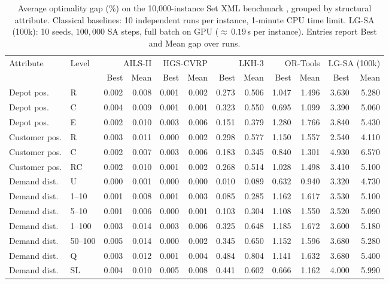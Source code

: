 \documentclass[letterpaper]{article} %
\begin{document}
\begin{table}[t]
\centering
\caption{Average optimality gap (\%) on the 10,000-instance Set XML benchmark \citep{queiroga_10000_nodate}, grouped by structural attribute. Classical baselines: 10 independent runs per instance, 1-minute CPU time limit. LG-SA (100k): 10 seeds, $100{,}000$ SA steps, full batch on GPU ($\approx$\,$0.19$\,s per instance). Entries report Best and Mean gap over runs.}
\label{tab:xml_by_groups}
\small
\begin{tabular}{llrrrrrrrrrr}
\toprule
Attribute & Level & \multicolumn{2}{r}{AILS-II} & \multicolumn{2}{r}{HGS-CVRP} & \multicolumn{2}{r}{LKH-3} & \multicolumn{2}{r}{OR-Tools} & \multicolumn{2}{r}{LG-SA (100k)} \\
 &  & Best & Mean & Best & Mean & Best & Mean & Best & Mean & Best & Mean \\
\midrule
Depot pos. & R & 0.002 & 0.008 & 0.001 & 0.002 & 0.273 & 0.506 & 1.047 & 1.496 & 3.630 & 5.280 \\
Depot pos. & C & 0.004 & 0.009 & 0.001 & 0.001 & 0.323 & 0.550 & 0.695 & 1.099 & 3.390 & 5.060 \\
Depot pos. & E & 0.002 & 0.010 & 0.003 & 0.006 & 0.151 & 0.379 & 1.280 & 1.766 & 3.840 & 5.430 \\
Customer pos. & R & 0.003 & 0.011 & 0.000 & 0.002 & 0.298 & 0.577 & 1.150 & 1.557 & 2.540 & 4.110 \\
Customer pos. & C & 0.002 & 0.007 & 0.003 & 0.006 & 0.183 & 0.345 & 0.840 & 1.301 & 4.930 & 6.570 \\
Customer pos. & RC & 0.002 & 0.010 & 0.001 & 0.002 & 0.268 & 0.514 & 1.028 & 1.498 & 3.410 & 5.100 \\
Demand dist. & U & 0.000 & 0.001 & 0.000 & 0.000 & 0.010 & 0.089 & 0.632 & 0.940 & 3.320 & 4.730 \\
Demand dist. & 1--10 & 0.001 & 0.008 & 0.001 & 0.003 & 0.085 & 0.285 & 1.162 & 1.617 & 3.530 & 5.100 \\
Demand dist. & 5--10 & 0.001 & 0.006 & 0.000 & 0.001 & 0.103 & 0.304 & 1.108 & 1.550 & 3.520 & 5.090 \\
Demand dist. & 1--100 & 0.003 & 0.014 & 0.003 & 0.006 & 0.325 & 0.648 & 1.185 & 1.672 & 3.600 & 5.180 \\
Demand dist. & 50--100 & 0.005 & 0.014 & 0.000 & 0.002 & 0.345 & 0.650 & 1.152 & 1.596 & 3.680 & 5.280 \\
Demand dist. & Q & 0.003 & 0.012 & 0.001 & 0.004 & 0.484 & 0.804 & 1.141 & 1.632 & 3.680 & 5.400 \\
Demand dist. & SL & 0.004 & 0.010 & 0.005 & 0.008 & 0.441 & 0.602 & 0.666 & 1.162 & 4.000 & 5.990 \\

\end{tabular}
\end{table}
\end{document}
